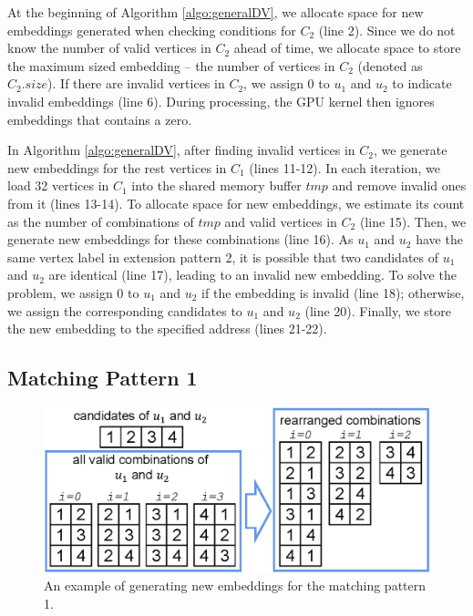 At the beginning of Algorithm \ref{algo:generalDV}, we allocate space for new embeddings generated when checking
conditions for $C_2$ (line 2). Since we do not know the number of valid vertices in $C_2$ ahead of time, we allocate
space to store the maximum sized embedding – the number of vertices in  $C_2$ (denoted as $C_{2}.size$). If there are
invalid vertices in $C_2$, we assign 0 to $u_1$ and $u_2$ to indicate invalid embeddings (line 6). During processing,
the GPU kernel then ignores embeddings that contains a zero.


In Algorithm \ref{algo:generalDV}, after finding invalid vertices in $C_2$, we generate new embeddings for the rest
vertices in $C_1$ (lines 11-12). In each iteration, we load 32 vertices in $C_1$ into the shared memory buffer $tmp$
and remove invalid ones from it (lines 13-14). To allocate space for new embeddings, we estimate its count as the
number of combinations of $tmp$ and valid vertices in $C_2$ (line 15). Then, we generate new embeddings for these
combinations (line 16). As $u_1$ and $u_2$ have the same vertex label in extension pattern 2, it is possible that two
candidates of $u_1$ and $u_2$ are identical (line 17),  leading to an invalid new embedding. To solve the problem, we
assign 0 to $u_1$ and $u_2$ if the embedding is invalid (line 18); otherwise, we assign the corresponding candidates to
$u_1$ and $u_2$ (line 20). Finally, we store the new embedding to the specified address (lines 21-22).


\subsection{Matching Pattern 1}
\begin{figure} [t]
\centering
\includegraphics[width=\columnwidth]{./figure/ep1opt.eps}
\caption{An example of generating new embeddings for the matching pattern 1.}	
\label{fig:ep1opt}
\end{figure}


